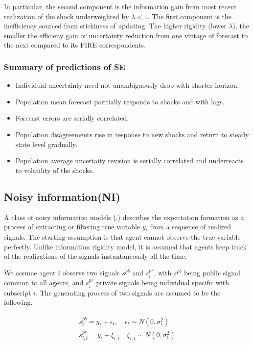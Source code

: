 \documentclass[]{article}
\begin{document}
 In particular, the second component is the information gain from most recent realization of the shock underweighted by $\lambda<1$. The first component is the inefficiency sourced from stickiness of updating. The higher rigidity (lower $\lambda$), the smaller the efficieny gain or uncertainty reduction from one vintage of forecast to the next compared to its FIRE correspondents. 

\subsubsection{Summary of predictions of SE}

\begin{itemize}
\item Individual uncertainty need not unambiguously drop with shorter horizon. 
\item Population mean forecast paritially responds to shocks and with lags. 
\item Forecast errors are serially correlated. 
\item Population disagreements rise in response to new shocks and return to steady state level gradually. 
\item Population average uncertaity revision is serially correlated and underreacts to volatility of the shocks.
 
\end{itemize}

\subsection{Noisy information(NI)}

A class of noisy information models (\citet{},\citet{}) describes the expectation formation as a process of extracting or filtering true variable $y_t$ from a sequence of realized signals. The starting assumption is that agent cannot observe the true variable perfectly. Unlike information rigidity model, it is assumed that agents keep track of the realizations of the signals instantaneously all the time. 

We assume agent $i$ observe two signals $s^{pb}$ and $s^{pr}_i$, with $s^{pb}$ being public signal common to all agents, and $s^{pr}_i$ private signals being individual specific with subscript $i$. The generating process of two signals are assumed to be the following.

\begin{eqnarray}
\begin{aligned}
s^{pb}_t = y_t + \epsilon_t, \quad \epsilon_t \sim N(0,\sigma^2_\epsilon)\\ 
s^{pr}_{i,t} = y_t + \xi_{i,t} \quad \xi_{i,t} \sim N(0,\sigma^2_\epsilon)
\end{aligned}
\end{eqnarray}
\end{document}
